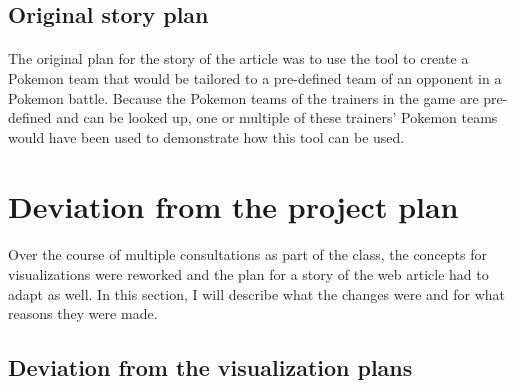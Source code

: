 \documentclass[12pt, a4paper]{article}
\begin{document}
		\subsection{Original story plan}
			\paragraph{}
				The original plan for the story of the article was to use the tool to create a Pokemon team that would be tailored to a pre-defined team of an opponent in a Pokemon battle. Because the Pokemon teams of the trainers in the game are pre-defined and can be looked up, one or multiple of these trainers' Pokemon teams would have been used to demonstrate how this tool can be used.
	\section{Deviation from the project plan}
		\paragraph{}
			Over the course of multiple consultations as part of the class, the concepts for visualizations were reworked and the plan for a story of the web article had to adapt as well. In this section, I will describe what the changes were and for what reasons they were made.
		\subsection{Deviation from the visualization plans}\label{sec:newvis}
\end{document}
